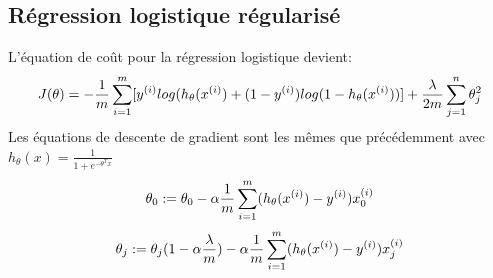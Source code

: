 \documentclass{article}
\theoremstyle{definition}
\begin{document}
\subsection{Régression logistique régularisé}
L'équation de coût pour la régression logistique devient:
\begin{equation*}
J(\theta) = -{1\over m} \sum_{i=1}^{m}
[y^{(i)}log(h_\theta(x^{(i)})+(1-y^{(i)})log(1-h_\theta(x^{(i)}))]+ {\lambda \over 2m} \sum_{j=1}^{n} \theta_j^{2}
\end{equation*}
Les équations de descente de gradient sont les mêmes que précédemment avec $h_\theta(x)= \frac{1}{1+e^{-\theta^{T}x}}$ 
\begin{equation*}
\theta_0 := \theta_0 - \alpha {1\over m} \sum_{i=1}^{m}(h_\theta(x^{(i)})-y^{(i)})x_0^{(i)}
\end{equation*}
\begin{equation*}
\theta_j := \theta_j(1-\alpha {\lambda\over m}) - \alpha {1\over m} \sum_{i=1}^{m}(h_\theta(x^{(i)})-y^{(i)})x_j^{(i)}
\end{equation*}
\newpage
\end{document}
